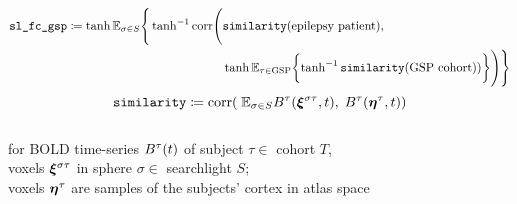 \documentclass[10pt]{article}
\begin{document}
\begin{equation*}
\begin{split}
  \texttt{sl\_fc\_gsp} \coloneqq
  \hyptangent
  \mathbb{E}_{\sigma \in S} \Bigg\{ 
  \hyptangent^{-1}
  \text{corr} \Bigg( &
            \texttt{similarity}\qty(\text{epilepsy patient}), \; \\
          & \hyptangent
            \mathbb{E}_{\tau \in \text{GSP}} \qty\bigg{ 
            \hyptangent^{-1} \texttt{similarity}\qty(\text{GSP cohort}) ) }
            \Bigg) \Bigg\} 
\end{split}            
\end{equation*}
\begin{equation*}
  \texttt{similarity} \coloneqq \text{corr}\qty( \;
                       \mathbb{E}_{\sigma \in S} B^{\tau}(\vb*{\xi}^{\sigma\tau}, t), \; 
                       B^{\tau}(\vb*{\eta}^{\tau}, t) ) \\
\end{equation*}
\\
for BOLD time-series $B^\tau\qty(t)$ of subject $\tau \in$ cohort $T$, \\
voxels $\vb*{\xi}^{\sigma\tau}$ in sphere $\sigma \in$ searchlight $S$; \\
voxels $\vb*{\eta}^\tau$ are samples of the subjects' cortex in atlas space
\end{document}
